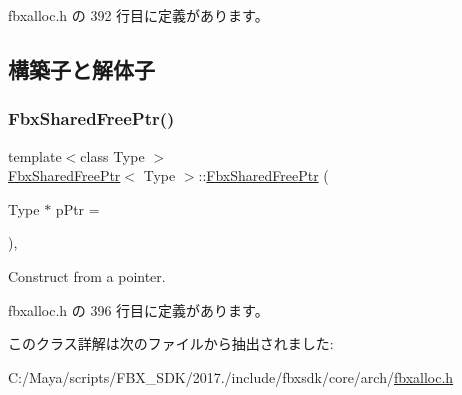  fbxalloc.\+h の 392 行目に定義があります。



\subsection{構築子と解体子}
\mbox{\label{class_fbx_shared_free_ptr_aed52ec1d3edb3564059995172aaf1de8}} 
\subsubsection{\texorpdfstring{Fbx\+Shared\+Free\+Ptr()}{FbxSharedFreePtr()}}
{\footnotesize\ttfamily template$<$class Type $>$ \\
\hyperlink{class_fbx_shared_free_ptr}{Fbx\+Shared\+Free\+Ptr}$<$ Type $>$\+::\hyperlink{class_fbx_shared_free_ptr}{Fbx\+Shared\+Free\+Ptr} (\begin{DoxyParamCaption}\item[{Type $\ast$}]{p\+Ptr = {} }\end{DoxyParamCaption})\hspace{0.3cm}{\ttfamily [inline]}, {\ttfamily [explicit]}}



Construct from a pointer. 



 fbxalloc.\+h の 396 行目に定義があります。



このクラス詳解は次のファイルから抽出されました\+:\begin{DoxyCompactItemize}
\item 
C\+:/\+Maya/scripts/\+F\+B\+X\+\_\+\+S\+D\+K/2017./include/fbxsdk/core/arch/\hyperlink{fbxalloc_8h}{fbxalloc.\+h}\end{DoxyCompactItemize}
